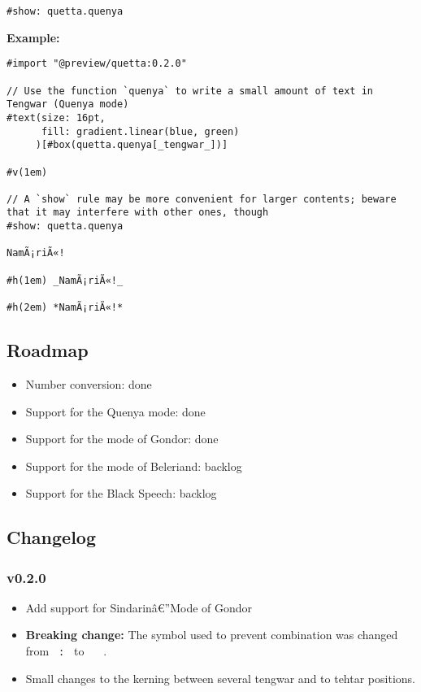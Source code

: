 \begin{verbatim}
#show: quetta.quenya
\end{verbatim}

\textbf{Example:}

\begin{verbatim}
#import "@preview/quetta:0.2.0"

// Use the function `quenya` to write a small amount of text in Tengwar (Quenya mode)
#text(size: 16pt, 
      fill: gradient.linear(blue, green)
     )[#box(quetta.quenya[_tengwar_])]

#v(1em)

// A `show` rule may be more convenient for larger contents; beware that it may interfere with other ones, though
#show: quetta.quenya

NamÃ¡riÃ«!

#h(1em) _NamÃ¡riÃ«!_

#h(2em) *NamÃ¡riÃ«!*
\end{verbatim}

\subsection{Roadmap}\label{roadmap}

\begin{itemize}
\tightlist
\item
  Number conversion: done
\item
  Support for the Quenya mode: done
\item
  Support for the mode of Gondor: done
\item
  Support for the mode of Beleriand: backlog
\item
  Support for the Black Speech: backlog
\end{itemize}

\subsection{Changelog}\label{changelog}

\subsubsection{v0.2.0}\label{v0.2.0}

\begin{itemize}
\tightlist
\item
  Add support for Sindarinâ€''Mode of Gondor
\item
  \textbf{Breaking change:} The symbol used to prevent combination was
  changed from \texttt{\ :\ } to \texttt{\ \textbar{}\ } .
\item
  Small changes to the kerning between several tengwar and to tehtar
  positions.
\end{itemize}

